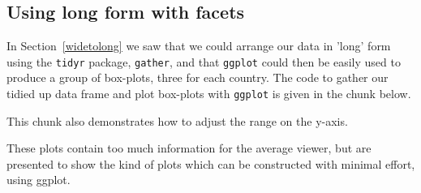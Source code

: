 \documentclass[titlepage]{book}\usepackage{knitr}
\begin{document}
\subsection{ Using long form with facets}
In Section~\ref{widetolong} we saw that we could arrange our data in 'long' form using the \texttt{tidyr} package, \texttt{gather}, and that \texttt{ggplot} could then be easily used to produce a group of box-plots, three for each country. The code to gather our tidied up data frame and plot box-plots with \texttt{ggplot} is given in the chunk below.
\begin{knitrout}
\color{fgcolor}\begin{kframe}
\begin{alltt}
 \hlkwb{<-}   
     
     

\hlopt{$}

 \hlkwb{<-} \hlstd{(} \hlstd{(}    
 \hlopt{+} \hlstd{()}
\end{alltt}
\end{kframe}
\end{knitrout}

This chunk also demonstrates how to adjust the range on the y-axis.
\begin{knitrout}
\color{fgcolor}\begin{kframe}
\begin{alltt}
 \hlkwb{<-}  \hlopt{+} \hlstd{()} \hlopt{+} \hlstd{(}\hlstd{,}\hlstd{)}
 \hlkwb{<-}  \hlopt{+} \hlopt{~}
\end{alltt}
\end{kframe}
\end{knitrout}
These plots contain too much information for the average viewer, but are presented to show the kind of plots which can be constructed with minimal effort, using ggplot.
\end{document}
